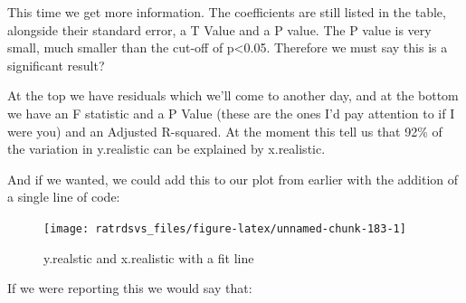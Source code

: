 \documentclass[
]{book}
\newenvironment{Shaded}{\begin{snugshade}}{\end{snugshade}}
\newcommand{\CommentTok}[1]{\textcolor[rgb]{0.56,0.35,0.01}{\textit{#1}}}
\newcommand{\DataTypeTok}[1]{\textcolor[rgb]{0.13,0.29,0.53}{#1}}
\newcommand{\DecValTok}[1]{\textcolor[rgb]{0.00,0.00,0.81}{#1}}
\newcommand{\KeywordTok}[1]{\textcolor[rgb]{0.13,0.29,0.53}{\textbf{#1}}}
\newcommand{\NormalTok}[1]{#1}
\newcommand{\OperatorTok}[1]{\textcolor[rgb]{0.81,0.36,0.00}{\textbf{#1}}}
\newcommand{\StringTok}[1]{\textcolor[rgb]{0.31,0.60,0.02}{#1}}
\begin{document}
This time we get more information. The coefficients are still listed in the table, alongside their standard error, a T Value and a P value. The P value is very small, much smaller than the cut-off of p\textless{}0.05. Therefore we must say this is a significant result?

At the top we have residuals which we'll come to another day, and at the bottom we have an F statistic and a P Value (these are the ones I'd pay attention to if I were you) and an Adjusted R-squared. At the moment this tell us that 92\% of the variation in y.realistic can be explained by x.realistic.

And if we wanted, we could add this to our plot from earlier with the addition of a single line of code:

\begin{Shaded}
\end{Shaded}

\begin{figure}

{\centering \texttt{[image: ratrdsvs\_files/figure-latex/unnamed-chunk-183-1]} 

}

\caption{y.realstic and x.realistic with a fit line}\label{fig:unnamed-chunk-183}
\end{figure}

If we were reporting this we would say that:
\end{document}
